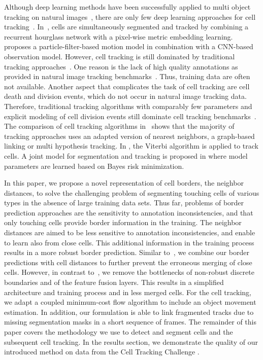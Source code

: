 \documentclass[10pt,letterpaper]{article}
\begin{document}
Although deep learning methods have been successfully applied to multi object tracking on natural images~\cite{Ciaparrone2020, Yao2019}, there are only few deep learning approaches for cell tracking~\cite{Payer2019, He2017}. In~\cite{Payer2019}, cells are simultaneously segmented and tracked by combining a recurrent hourglass network with a pixel-wise metric embedding learning. \cite{He2017} proposes a particle-filter-based motion model in combination with a CNN-based observation model. However, cell tracking is still dominated by traditional tracking approaches~\cite{Ulman2017, Magnusson2015}. One reason is the lack of high quality annotations as provided in natural image tracking benchmarks~\cite{MOTS2019, DAVIS2017, YTVOS2018}. Thus, training data are often not available. Another aspect that complicates the task of cell tracking are cell death and division events, which do not occur in natural image tracking data. Therefore, traditional tracking algorithms with comparably few parameters and explicit modeling of cell division events still dominate cell tracking benchmarks~\cite{Ulman2017}. The comparison of cell tracking algorithms in~\cite{Ulman2017} shows that the majority of tracking approaches uses an adapted version of nearest neighbors, a graph-based linking or multi hypothesis tracking. In \cite{Magnusson2015}, the Viterbi algorithm is applied to track cells. A joint model for segmentation and tracking is proposed in \cite{Sixta2020} where model parameters are learned based on Bayes risk minimization.

In this paper, we propose a novel representation of cell borders, the neighbor distances, to solve the challenging problem of segmenting touching cells of various types in the absence of large training data sets. Thus far, problems of border prediction approaches are the sensitivity to annotation inconsistencies, and that only touching cells provide border information in the training. The neighbor distances are aimed to be less sensitive to annotation inconsistencies, and enable to learn also from close cells. This additional information in the training process results in a more robust border prediction. Similar to~\cite{Li2019}, we combine our border predictions with cell distances to further prevent the erroneous merging of close cells. However, in contrast to~\cite{Li2019}, we remove the bottlenecks of non-robust discrete boundaries and of the feature fusion layers. This results in a simplified architecture and training process and in less merged cells. For the cell tracking, we adapt a coupled minimum-cost flow algorithm to include an object movement estimation. In addition, our formulation is able to link fragmented tracks due to missing segmentation masks in a short sequence of frames. The remainder of this paper covers the methodology we use to detect and segment cells and the subsequent cell tracking. In the results section, we demonstrate the quality of our introduced method on data from the Cell Tracking Challenge \cite{Ulman2017, Maska2014}.
\end{document}
